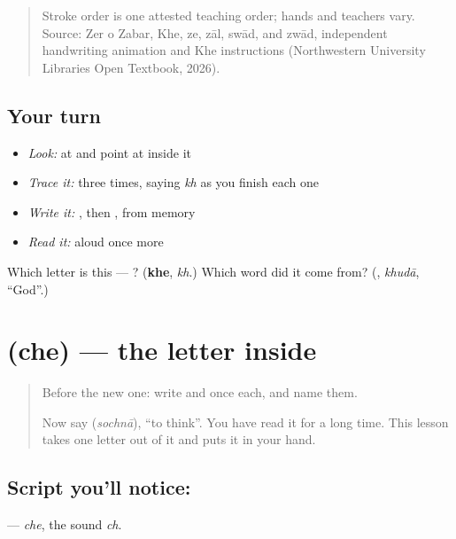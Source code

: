 \begin{quote}
Stroke order is one attested teaching order; hands and teachers vary. Source: Zer o Zabar, Khe, ze, zāl, swād, and zwād, independent  handwriting animation and Khe instructions (Northwestern University Libraries Open Textbook, 2026).
\end{quote}

\subsection*{Your turn}
\begin{itemize}
\raggedright
  \item \emph{Look:} at \textbf{} and point at  inside it
  \item \emph{Trace it:}  three times, saying \emph{kh} as you finish each one
  \item \emph{Write it:} , then , from memory
  \item \emph{Read it:} \textbf{} aloud once more
\end{itemize}

\begin{tcolorbox}[breakable,colback=teal!4,colframe=teal!35!black,title={Before you move on}]
Which letter is this — ? (\textbf{khe}, \emph{kh}.) Which word did it come from? (\textbf{}, \emph{khudā}, \textquotedblleft{}God\textquotedblright{}.)
\end{tcolorbox}
\section[\texorpdfstring{\ur{چ} (che)}{چ (che)}]{ (che) — the letter inside }

\label{lesson:UR-W35-che}



\begin{quote}
Before the new one: write  and  once each, and name them.

Now say \textbf{} (\emph{sochnā}), \textquotedblleft{}to think\textquotedblright{}. You have read it for a long time. This lesson takes one letter out of it and puts it in your hand.
\end{quote}

\subsection*{Script you'll notice: }
\textbf{} — \emph{che}, the sound \emph{ch}.

